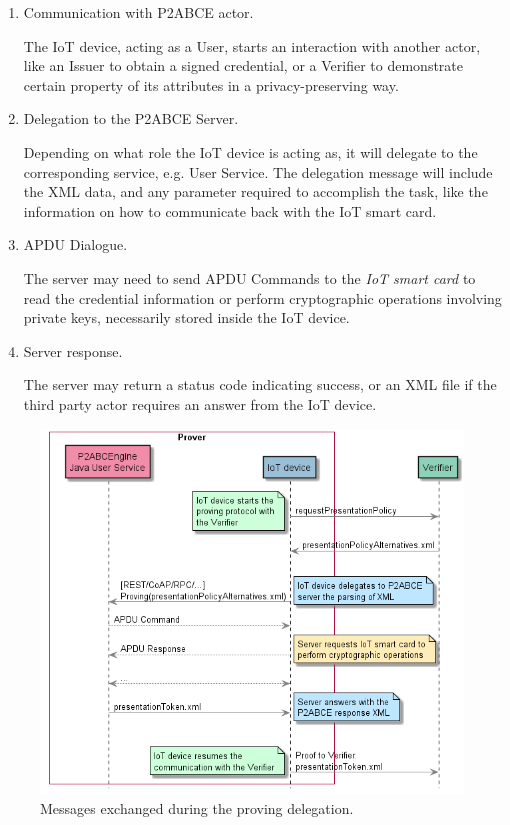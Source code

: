 \begin{enumerate}
	\item Communication with P2ABCE actor.
	
	The IoT device, acting as a User, starts an interaction with another actor, like an Issuer to obtain a signed credential, or a Verifier to demonstrate certain property of its attributes in a privacy-preserving way.
	
	\item Delegation to the P2ABCE Server.
	
	Depending on what role the IoT device is acting as, it will delegate to the corresponding service, e.g. User Service. The delegation message will include the XML data, and any parameter required to accomplish the task, like the information on how to communicate back with the IoT smart card.
	
	\item APDU Dialogue.
	
	The server may need to send APDU Commands to the \textit{IoT smart card} to read the credential information or perform cryptographic operations involving private keys, necessarily stored inside the IoT device.
	
	\item Server response.
	
	The server may return a status code indicating success, or an XML file if the third party actor requires an answer from the IoT device.
	
\end{enumerate}

\begin{figure}[bth]
	\begin{center}
		\includegraphics[width=\linewidth]{gfx/UML/provingDelegation}
	\end{center}
	\caption{Messages exchanged during the proving delegation.}
	\label{fig:DelegationProving}
\end{figure}

